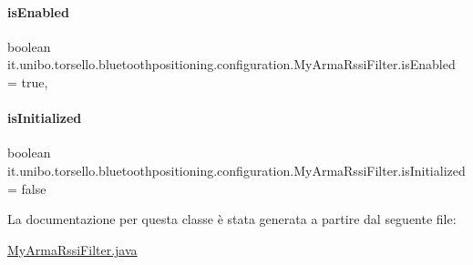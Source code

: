 \hypertarget{classit_1_1unibo_1_1torsello_1_1bluetoothpositioning_1_1configuration_1_1MyArmaRssiFilter_a7a046687ef0d8dd63307cabfbb33fcf8_a7a046687ef0d8dd63307cabfbb33fcf8}{}\label{classit_1_1unibo_1_1torsello_1_1bluetoothpositioning_1_1configuration_1_1MyArmaRssiFilter_a7a046687ef0d8dd63307cabfbb33fcf8_a7a046687ef0d8dd63307cabfbb33fcf8} 
\paragraph{\texorpdfstring{is\+Enabled}{isEnabled}}
{\footnotesize\ttfamily boolean it.\+unibo.\+torsello.\+bluetoothpositioning.\+configuration.\+My\+Arma\+Rssi\+Filter.\+is\+Enabled = true\hspace{0.3cm}{\ttfamily [static]}, {\ttfamily [private]}}

\hypertarget{classit_1_1unibo_1_1torsello_1_1bluetoothpositioning_1_1configuration_1_1MyArmaRssiFilter_a01cc7f81fd8e0ca8ed3c197d9fc1fd11_a01cc7f81fd8e0ca8ed3c197d9fc1fd11}{}\label{classit_1_1unibo_1_1torsello_1_1bluetoothpositioning_1_1configuration_1_1MyArmaRssiFilter_a01cc7f81fd8e0ca8ed3c197d9fc1fd11_a01cc7f81fd8e0ca8ed3c197d9fc1fd11} 
\paragraph{\texorpdfstring{is\+Initialized}{isInitialized}}
{\footnotesize\ttfamily boolean it.\+unibo.\+torsello.\+bluetoothpositioning.\+configuration.\+My\+Arma\+Rssi\+Filter.\+is\+Initialized = false\hspace{0.3cm}{\ttfamily [private]}}



La documentazione per questa classe è stata generata a partire dal seguente file\+:\begin{DoxyCompactItemize}
\item 
\hyperlink{MyArmaRssiFilter_8java}{My\+Arma\+Rssi\+Filter.\+java}\end{DoxyCompactItemize}
